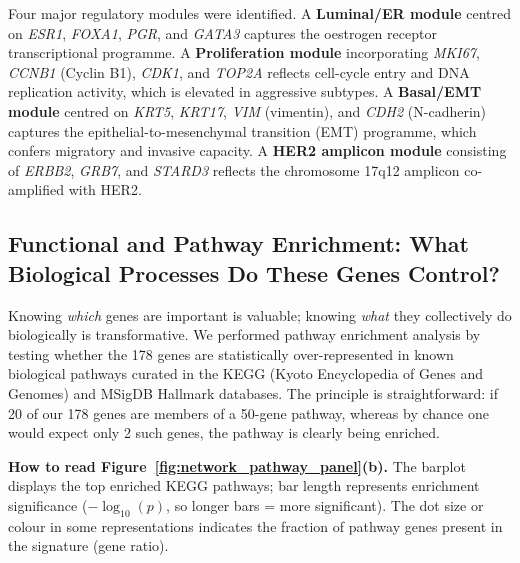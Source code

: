 \documentclass[10pt,a4paper,twocolumn]{article}
\begin{document}
Four major regulatory modules were identified. A \textbf{Luminal/ER module} centred on \textit{ESR1}, \textit{FOXA1}, \textit{PGR}, and \textit{GATA3} captures the oestrogen receptor transcriptional programme. A \textbf{Proliferation module} incorporating \textit{MKI67}, \textit{CCNB1} (Cyclin B1), \textit{CDK1}, and \textit{TOP2A} reflects cell-cycle entry and DNA replication activity, which is elevated in aggressive subtypes. A \textbf{Basal/EMT module} centred on \textit{KRT5}, \textit{KRT17}, \textit{VIM} (vimentin), and \textit{CDH2} (N-cadherin) captures the epithelial-to-mesenchymal transition (EMT) programme, which confers migratory and invasive capacity. A \textbf{HER2 amplicon module} consisting of \textit{ERBB2}, \textit{GRB7}, and \textit{STARD3} reflects the chromosome 17q12 amplicon co-amplified with HER2.

\subsection{Functional and Pathway Enrichment: What Biological Processes Do These Genes Control?}

Knowing \textit{which} genes are important is valuable; knowing \textit{what} they collectively do biologically is transformative. We performed pathway enrichment analysis by testing whether the 178 genes are statistically over-represented in known biological pathways curated in the KEGG (Kyoto Encyclopedia of Genes and Genomes) and MSigDB Hallmark databases. The principle is straightforward: if 20 of our 178 genes are members of a 50-gene pathway, whereas by chance one would expect only 2 such genes, the pathway is clearly being enriched.

\textbf{How to read Figure~\ref{fig:network_pathway_panel}(b).} The barplot displays the top enriched KEGG pathways; bar length represents enrichment significance ($-\log_{10}(p)$, so longer bars = more significant). The dot size or colour in some representations indicates the fraction of pathway genes present in the signature (gene ratio).
\end{document}
